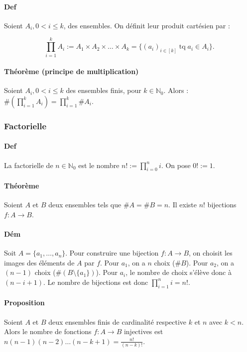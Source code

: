 \documentclass{article}
\DeclareMathOperator{\tq}{\text{ tq }}
\begin{document}
			\paragraph{Def} Soient $A_i, 0 < i \leq k$, des ensembles. On définit leur produit cartésien par :

			\[\prod_{i=1}^kA_i := A_1 \times A_2 \times \ldots \times A_k = \{(a_i)_{i \in [k]} \tq a_i \in A_i\}.\]

			\paragraph{Théorème (principe de multiplication)} Soient $A_i, 0 < i \leq k$ des ensembles finis, pour $k \in \mathbb N_0$. Alors :
			$\#\left(\prod_{i=1}^kA_i\right) = \prod_{i=1}^k\#A_i$.

			\subsubsection{Factorielle}

			\paragraph{Def} La factorielle de $n \in \mathbb N_0$ est le nombre $n! := \prod_{i=0}^ni$. On pose $0! := 1$.

			\paragraph{Théorème} Soient $A$ et $B$ deux ensembles tels que $\#A = \#B = n$. Il existe $n!$ bijections $f : A \to B$.

			\paragraph{Dém} Soit $A = \{a_1, \ldots, a_n\}$. Pour construire une bijection $f : A \to B$, on choisit les images des éléments de $A$ par $f$. Pour $a_1$,
			on a $n$ choix ($\#B$). Pour $a_2$, on a $(n-1)$ choix ($\#(B \setminus \{a_1\})$). Pour $a_i$, le nombre de choix s'élève donc à $(n-i+1)$.
			Le nombre de bijections est donc $\prod_{i=1}^ni = n!$.

			\paragraph{Proposition} Soient $A$ et $B$ deux ensembles finis de cardinalité respective $k$ et $n$ avec $k < n$. Alors le nombre de fonctions $f : A \to B$
			injectives est $n(n-1)(n-2)\ldots(n-k+1) = \frac {n!}{(n-k)!}$.
\end{document}

